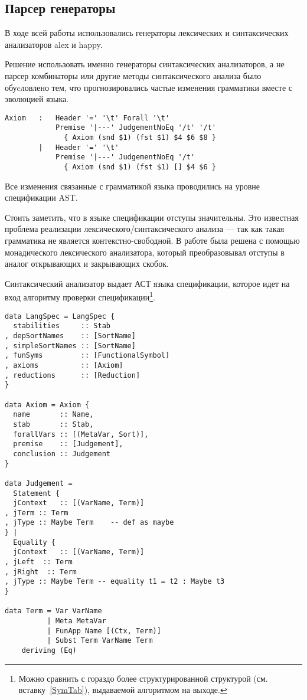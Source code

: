 \subsection{Парсер генераторы}
В ходе всей работы использовались генераторы лексических и синтаксических анализаторов alex\cite{alex} и happy\cite{happy}.

Решение использовать именно генераторы синтаксических анализаторов, а не парсер комбинаторы\cite{parsec} или другие методы синтаксического анализа было обуcловлено тем, что прогнозировались частые изменения грамматики вместе с эволюцией языка.

\begin{lstlisting}[caption={Часть спецификации синтаксического анализатора},captionpos=b, frame=single]
Axiom   :   Header '=' '\t' Forall '\t'
            Premise '|---' JudgementNoEq '/t' '/t'
              { Axiom (snd $1) (fst $1) $4 $6 $8 }
        |   Header '=' '\t'
            Premise '|---' JudgementNoEq '/t'
              { Axiom (snd $1) (fst $1) [] $4 $6 }
\end{lstlisting}

Все изменения связанные с грамматикой языка проводились на уровне спецификации AST.

\hfill

Стоить заметить, что в языке спецификации отступы значительны. Это известная проблема реализации лексического/синтаксического анализа --- так как такая грамматика не является контекстно-свободной. В работе была решена с помощью монадического лексического анализатора, который преобразовывал отступы в аналог открывающих и закрывающих скобок.

Синтаксический анализатор выдает АСТ языка спецификации, которое идет на вход алгоритму проверки спецификации\footnote{Можно сравнить с гораздо более структурированной структурой (см. вставку~\ref{SymTab}), выдаваемой алгоритмом на выходе.}.

\begin{lstlisting}[caption={АСТ языка спецификации},captionpos=b,frame=single]
data LangSpec = LangSpec {
  stabilities     :: Stab
, depSortNames    :: [SortName]
, simpleSortNames :: [SortName]
, funSyms         :: [FunctionalSymbol]
, axioms          :: [Axiom]
, reductions      :: [Reduction]
}

data Axiom = Axiom {
  name       :: Name,
  stab       :: Stab,
  forallVars :: [(MetaVar, Sort)],
  premise    :: [Judgement],
  conclusion :: Judgement
}

data Judgement =
  Statement {
  jContext   :: [(VarName, Term)]
, jTerm :: Term
, jType :: Maybe Term    -- def as maybe
} |
  Equality {
  jContext   :: [(VarName, Term)]
, jLeft  :: Term
, jRight  :: Term
, jType :: Maybe Term -- equality t1 = t2 : Maybe t3
}

data Term = Var VarName
          | Meta MetaVar
          | FunApp Name [(Ctx, Term)]
          | Subst Term VarName Term
    deriving (Eq)
\end{lstlisting}


